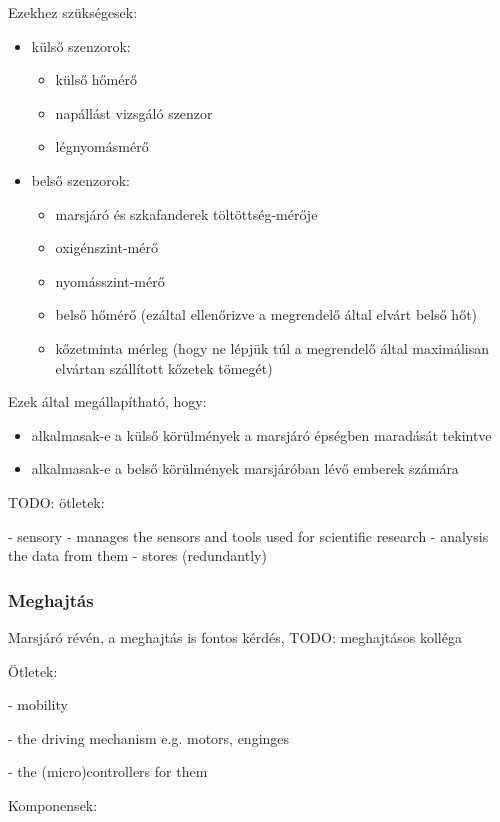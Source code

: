 \documentclass[12pt]{report}
\begin{document}
Ezekhez szükségesek:
\begin{itemize}
  \item külső szenzorok: \begin{itemize}
      \item külső hőmérő
      \item napállást vizsgáló szenzor
      \item légnyomásmérő
    \end{itemize}
  \item belső szenzorok: \begin{itemize}
      \item marsjáró és szkafanderek töltöttség-mérője
      \item oxigénszint-mérő
      \item nyomásszint-mérő
      \item belső hőmérő (ezáltal ellenőrizve a megrendelő által elvárt belső hőt)
      \item kőzetminta mérleg (hogy ne lépjük túl a megrendelő által maximálisan elvártan szállított kőzetek tömegét)
    \end{itemize}
\end{itemize}

Ezek által megállapítható, hogy:
\begin{itemize}
  \item alkalmasak-e a külső körülmények a marsjáró épségben maradását tekintve
  \item alkalmasak-e a belső körülmények marsjáróban lévő emberek számára
\end{itemize}

TODO: 
ötletek:

- sensory
  - manages the sensors and tools used for scientific research
  - analysis the data from them
  - stores (redundantly)

\subsubsection{Meghajtás}

Marsjáró révén, a meghajtás is fontos kérdés, TODO: meghajtásos kolléga

Ötletek:

- mobility

  - the driving mechanism e.g. motors, enginges

  - the (micro)controllers for them

Komponensek:
\end{document}

